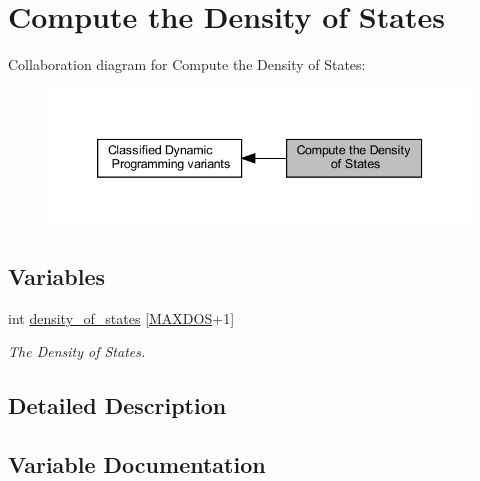 \hypertarget{group__dos}{}\section{Compute the Density of States}
\label{group__dos}
Collaboration diagram for Compute the Density of States\+:
\nopagebreak
\begin{figure}[H]
\begin{center}
\leavevmode
\includegraphics[width=339pt]{group__dos}
\end{center}
\end{figure}
\subsection*{Variables}
\begin{DoxyCompactItemize}
\item 
int \hyperlink{group__dos_ga937634a76b46a22530a74906f1957a9e}{density\+\_\+of\+\_\+states} \mbox{[}\hyperlink{subopt_8h_a5ec740b80afb4906ba4311dbd8ddbd89}{M\+A\+X\+D\+OS}+1\mbox{]}
\begin{DoxyCompactList}\small\item\em The Density of States. \end{DoxyCompactList}\end{DoxyCompactItemize}


\subsection{Detailed Description}


\subsection{Variable Documentation}
\mbox{\label{group__dos_ga937634a76b46a22530a74906f1957a9e}} 
